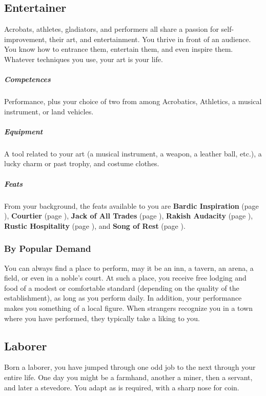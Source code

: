 \subsection*{Entertainer} \label{ssec::entertainer}
    Acrobats, athletes, gladiators, and performers all share a passion for self-improvement, their art, and entertainment. %
    You thrive in front of an audience.
    You know how to entrance them, entertain them, and even inspire them.
    Whatever techniques you use, your art is your life.

    \subparagraph{Competences} Performance, plus your choice of two from among Acrobatics, Athletics, a musical instrument, or land vehicles.

    \subparagraph{Equipment} A tool related to your art (a musical instrument, a weapon, a leather ball, etc.), a lucky charm or past trophy, and costume clothes.

    \subparagraph{Feats} From your background, the feats available to you are
    \textbf{Bardic Inspiration} (page \pageref{feat::bardicinspiration}),
    \textbf{Courtier} (page \pageref{feat::courtier}),
    \textbf{Jack of All Trades} (page \pageref{feat::jackofalltrades}),
    \textbf{Rakish Audacity} (page \pageref{feat::rakishaudacity}),
    \textbf{Rustic Hospitality} (page \pageref{feat::rustichospitality}), and
    \textbf{Song of Rest} (page \pageref{feat::songofrest}).

    \subsubsection{By Popular Demand} \label{feat::bypopulardemand}
        You can always find a place to perform, may it be an inn, a tavern, an arena, a field, or even in a noble's court.
        At such a place, you receive free lodging and food of a modest or comfortable standard (depending on the quality of the establishment), as long as you perform daily.
        In addition, your performance makes you something of a local figure.
        When strangers recognize you in a town where you have performed, they typically take a liking to you.

\subsection*{Laborer} \label{ssec::laborer}
    Born a laborer, you have jumped through one odd job to the next through your entire life.
    One day you might be a farmhand, another a miner, then a servant, and later a stevedore.
    You adapt as is required, with a sharp nose for coin.


